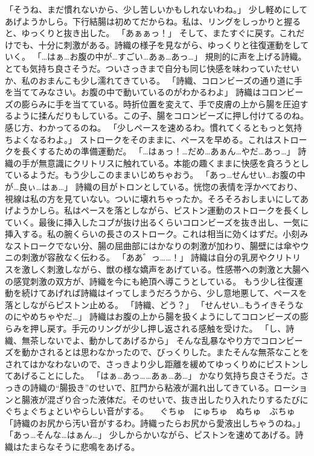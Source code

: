 「そうね、まだ慣れないから、少し苦しいかもしれないわね。」
少し軽めにしてあげようかしら。下行結腸は初めてだからね。私は、リングをしっかりと握ると、ゆっくりと抜き出した。
「あぁぁっ！」
そして、またすぐに戻す。これだけでも、十分に刺激がある。詩織の様子を見ながら、ゆっくりと往復運動をしていく。
「…はぁ…お腹の中が…すごい…あぁ…あっ…」
規則的に声を上げる詩織。とても気持ち良さそうだ。ついさっきまで自分も同じ快感を味わっていたせいか、私のおまんこも少し濡れてきている。
「詩織、コロンビーズの通り道に手を当ててみなさい。お腹の中で動いているのがわかるわよ」
詩織はコロンビーズの膨らみに手を当てている。時折位置を変えて、手で皮膚の上から腸を圧迫するように揉んだりもしている。この子、腸をコロンビーズに押し付けてるのね。感じ方、わかってるのね。
「少しペースを速めるわ。慣れてくるともっと気持ちよくなるわよ。」
ストロークをそのままに、ペースを早める。これはストロークを長くするための準備運動だ。
「…はぁっ！…だめ…あぁん…やだ…あっ…」
詩織の手が無意識にクリトリスに触れている。本能の趣くままに快感を貪ろうとしているようだ。もう少しこのままいじめちゃおう。
「あっ…せんせい…お腹の中が…良ぃ…はぁ…」
詩織の目がトロンとしている。恍惚の表情を浮かべており、視線は私の方を見ていない。ついに壊れちゃったか。そろそろおしまいにしてあげようかしら。私はペースを落としながら、ピストン運動のストロークを長くしていく。最後に挿入したコブが抜け出るくらいコロンビーズを抜き出し、一気に挿入する。私の腕くらいの長さのストローク。これは相当に効くはずだ。小刻みなストロークでない分、腸の屈曲部にはかなりの刺激が加わり、腸壁には傘やウニの刺激が容赦なく伝わる。
「ああ゛っ……！」
詩織は自分の乳房やクリトリスを激しく刺激しながら、獣の様な嬌声をあげている。性感帯への刺激と大腸への感覚刺激の双方が、詩織を今にも絶頂へ導こうとしている。
もう少し往復運動を続けてあげれば詩織はイってしまうだろうから、少し意地悪して、ペースを落としながらピストン止める。
「詩織、どう？」
「せんせい…もうイきそうなのにやめちゃやだ…」
詩織はお腹の上から腸を扱くようにしてコロンビーズの膨らみを押し戻す。手元のリングが少し押し返される感触を受けた。
「し、詩織、無茶しないでよ、動かしてあげるから」
そんな乱暴なやり方でコロンビーズを動かされるとは思わなかったので、びっくりした。またそんな無茶なことをされてはかなわないので、さっきより少し距離を緩めてゆっくりめにピストンしてあげることにした。
「はぁ…あっ……あぁ…あ…」
かなり気持ち良さそうだ。さっきの詩織の“腸扱き”のせいで、肛門から粘液が漏れ出してきている。ローションと腸液が混ざり合った液体だ。そのせいで、抜き出したり入れたりするたびにぐちょぐちょといやらしい音がする。
　ぐちゅ　にゅちゅ　ぬちゅ　ぶちゅ
「詩織のお尻から汚い音がするわ。詩織ったらお尻から愛液出しちゃうのね。」
「あっ…そんな…はぁん…」
少しからかいながら、ピストンを速めてあげる。詩織はたまらなそうに悲鳴をあげる。
